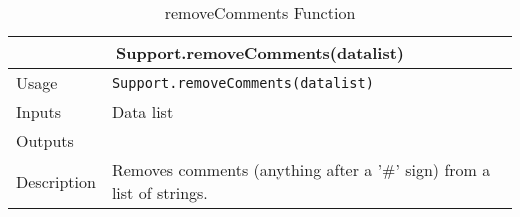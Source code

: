 \begin{table}
\caption{removeComments Function}
\begin{tabular}{ |p{2cm}||p{11cm}|  }
 \hline
 \multicolumn{2}{|c|}{\textbf{Support.removeComments(datalist)}} \\
 \hline
 Usage & \texttt{Support.removeComments(datalist)}\\ \hline
 Inputs & Data list \\ \hline
 Outputs &   \\ \hline
 Description & Removes comments (anything after a '\#' sign) from a list of strings. \\ \hline
\end{tabular}
\end{table}

 

